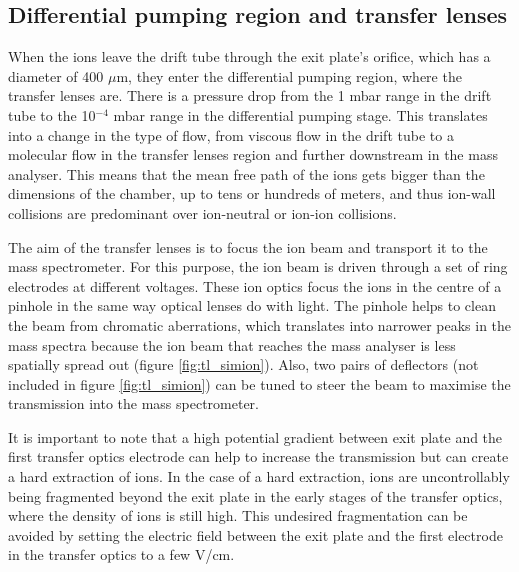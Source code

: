 \subsection{Differential pumping region and transfer lenses}
When the ions leave the drift tube through the exit plate's orifice, which has a diameter of 400 $\mu$m, they enter the differential pumping region, where the transfer lenses are. There is a pressure drop from the 1 mbar range in the drift tube to the 10$^{-4}$ mbar range in the differential pumping stage. This translates into a change in the type of flow, from viscous flow in the drift tube to a molecular flow in the transfer lenses region and further downstream in the mass analyser. This means that the mean free path of the ions gets bigger than the dimensions of the chamber, up to tens or hundreds of meters, and thus ion-wall collisions are predominant over ion-neutral or ion-ion collisions.

The aim of the transfer lenses is to focus the ion beam and transport it to the mass spectrometer. For this purpose, the ion beam is driven through a set of ring electrodes at different voltages. These ion optics focus the ions in the centre of a pinhole in the same way optical lenses do with light. The pinhole helps to clean the beam from chromatic aberrations, which translates into narrower peaks in the mass spectra because the ion beam that reaches the mass analyser is less spatially spread out (figure \ref{fig:tl_simion}). Also, two pairs of deflectors (not included in figure \ref{fig:tl_simion}) can be tuned to steer the beam to maximise the transmission into the mass spectrometer. 

It is important to note that a high potential gradient between exit plate and the first transfer optics electrode can help to increase the transmission but can create a hard extraction of ions. In the case of a hard extraction, ions are uncontrollably being fragmented beyond the exit plate in the early stages of the transfer optics, where the density of ions is still high. This undesired fragmentation can be avoided by setting  the electric field between the exit plate and the first electrode in the transfer optics to a few V/cm.

